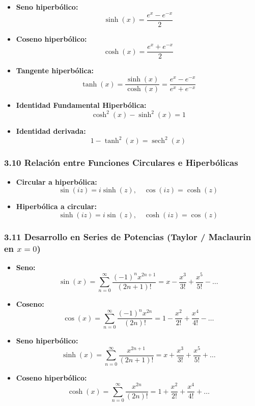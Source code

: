 \documentclass[11pt,a4paper]{article}
\begin{document}
\begin{itemize}
  \item \textbf{Seno hiperbólico:}
  \[
    \sinh(x) = \frac{e^x - e^{-x}}{2}
  \]
  \item \textbf{Coseno hiperbólico:}
  \[
    \cosh(x) = \frac{e^x + e^{-x}}{2}
  \]
  \item \textbf{Tangente hiperbólica:}
  \[
    \tanh(x) = \frac{\sinh(x)}{\cosh(x)} = \frac{e^x - e^{-x}}{e^x + e^{-x}}
  \]
  \item \textbf{Identidad Fundamental Hiperbólica:}
  \[
    \cosh^2(x) - \sinh^2(x) = 1
  \]
  \item \textbf{Identidad derivada:}
  \[
    1 - \tanh^2(x) = \operatorname{sech}^2(x)
  \]
\end{itemize}

\subsubsection*{3.10 Relación entre Funciones Circulares e Hiperbólicas}

\begin{itemize}
  \item \textbf{Circular a hiperbólica:}
  \[
    \sin(iz) = i\sinh(z), \quad \cos(iz) = \cosh(z)
  \]
  \item \textbf{Hiperbólica a circular:}
  \[
    \sinh(iz) = i\sin(z), \quad \cosh(iz) = \cos(z)
  \]
\end{itemize}

\subsubsection*{3.11 Desarrollo en Series de Potencias (Taylor / Maclaurin en $x = 0$)}

\begin{itemize}
  \item \textbf{Seno:}
  \[
    \sin(x) = \sum_{n=0}^\infty \frac{(-1)^n x^{2n+1}}{(2n+1)!} = x - \frac{x^3}{3!} + \frac{x^5}{5!} - \dots
  \]
  \item \textbf{Coseno:}
  \[
    \cos(x) = \sum_{n=0}^\infty \frac{(-1)^n x^{2n}}{(2n)!} = 1 - \frac{x^2}{2!} + \frac{x^4}{4!} - \dots
  \]
  \item \textbf{Seno hiperbólico:}
  \[
    \sinh(x) = \sum_{n=0}^\infty \frac{x^{2n+1}}{(2n+1)!} = x + \frac{x^3}{3!} + \frac{x^5}{5!} + \dots
  \]
  \item \textbf{Coseno hiperbólico:}
  \[
    \cosh(x) = \sum_{n=0}^\infty \frac{x^{2n}}{(2n)!} = 1 + \frac{x^2}{2!} + \frac{x^4}{4!} + \dots
  \]
\end{itemize}
\end{document}
